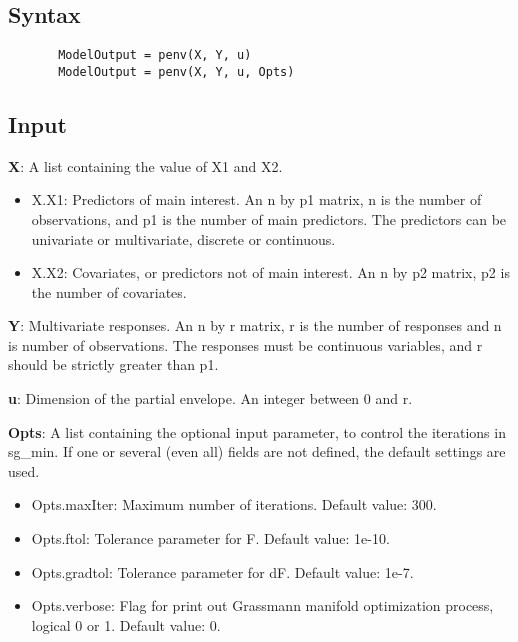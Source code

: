 \documentclass[a4paper,11pt,openany]{memoir}
\begin{document}
\subsection*{Syntax}


\begin{verbatim}       ModelOutput = penv(X, Y, u)
       ModelOutput = penv(X, Y, u, Opts)\end{verbatim}
    

\subsection*{Input}

\begin{par}
\textbf{X}: A list containing the value of X1 and X2.
\end{par} \vspace{1em}
\begin{itemize}
\setlength{\itemsep}{-1ex}
   \item X.X1: Predictors of main interest. An n by p1 matrix, n is the number of observations, and p1 is the number of main predictors. The predictors can be univariate or multivariate, discrete or continuous.
   \item X.X2: Covariates, or predictors not of main interest.  An n by p2 matrix, p2 is the number of covariates.
\end{itemize}
\begin{par}
\textbf{Y}: Multivariate responses. An n by r matrix, r is the number of responses and n is number of observations. The responses must be continuous variables, and r should be strictly greater than p1.
\end{par} \vspace{1em}
\begin{par}
\textbf{u}: Dimension of the partial envelope. An integer between 0 and r.
\end{par} \vspace{1em}
\begin{par}
\textbf{Opts}: A list containing the optional input parameter, to control the iterations in sg\_min. If one or several (even all) fields are not defined, the default settings are used.
\end{par} \vspace{1em}
\begin{itemize}
\setlength{\itemsep}{-1ex}
   \item Opts.maxIter: Maximum number of iterations.  Default value: 300.
   \item Opts.ftol: Tolerance parameter for F.  Default value: 1e-10.
   \item Opts.gradtol: Tolerance parameter for dF.  Default value: 1e-7.
   \item Opts.verbose: Flag for print out Grassmann manifold optimization process, logical 0 or 1. Default value: 0.
\end{itemize}
\end{document}
